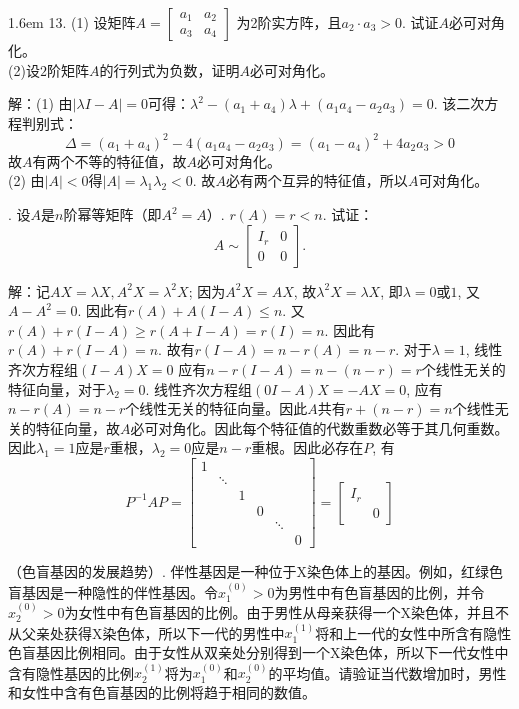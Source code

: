 \documentclass[10pt,twocolumn,letterpaper]{article}
\theoremstyle{mythmstyle}
\begin{document}
\vspace{1em}
\noindent 
{} 
\hangindent 1.6em 
13. (1) 设矩阵$A=\begin{bmatrix} a_{1} & a_{2}\\ a_{3} &a_{4} \end{bmatrix}$ 为2阶实方阵，且$a_{2}\cdot a_{3}>0$. 试证$A$必可对角化。\\
(2)设$2$阶矩阵$A$的行列式为负数，证明$A$必可对角化。 

\noindent 解：(1) 由$|\lambda I-A|=0$可得：$\lambda^{2}-(a_{1}+a_{4})\lambda+(a_{1}a_{4}-a_{2}a_{3})=0$. 该二次方程判别式：$$\Delta=(a_{1}+a_{4})^{2}-4(a_{1}a_{4}-a_{2}a_{3})=(a_{1}-a_{4})^{2}+4a_{2}a_{3}>0$$ 故$A$有两个不等的特征值，故$A$必可对角化。\\
(2) 由$|A|<0$得$|A|=\lambda_{1}\lambda_{2}<0$. 故$A$必有两个互异的特征值，所以$A$可对角化。

\vspace{1em}
. 设$A$是$n$阶幂等矩阵（即$A^{2}=A$）. $r(A)=r<n$. 试证：
$$
A\sim\begin{bmatrix} I_{r} & 0\\ 0 & 0 \end{bmatrix}.
$$

\noindent 解：记$AX=\lambda X, A^{2}X=\lambda^{2}X$; 因为$A^{2}X=AX$, 故$\lambda^{2}X=\lambda X$, 即$\lambda=0$或$1$, 又$A-A^{2}=0$. 因此有$r(A)+A(I-A) \le n$. 又
$r(A)+r(I-A) \ge r(A+I-A)=r(I)=n$. 因此有$r(A)+r(I-A)=n$. 故有$r(I-A)=n-r(A)=n-r$. 对于$\lambda=1$, 线性齐次方程组$(I-A)X=0$ 应有$n-r(I-A)=n-(n-r)=r$个线性无关的特征向量，对于$\lambda_{2}=0$. 线性齐次方程组$(0I-A)X=-AX=0$, 应有$n-r(A)=n-r$个线性无关的特征向量。因此$A$共有$r+(n-r)=n$个线性无关的特征向量，故$A$必可对角化。因此每个特征值的代数重数必等于其几何重数。因此$\lambda_{1}=1$应是$r$重根，$\lambda_{2}=0$应是$n-r$重根。因此必存在$P$, 有
$$P^{-1}AP=
\begin{bmatrix} 
1 & & & & & \\
 & \ddots & & & & \\
 & & 1 & & & \\
 & & & 0 & & \\
 & & & & \ddots & \\
 & & & & & 0
\end{bmatrix}=
\begin{bmatrix}
I_{r} & \\
 & 0
\end{bmatrix}
$$

\vspace{1em}
（色盲基因的发展趋势）. 伴性基因是一种位于X染色体上的基因。例如，红绿色盲基因是一种隐性的伴性基因。令$x_1^{(0)}>0$为男性中有色盲基因的比例，并令$x_2^{(0)}>0$为女性中有色盲基因的比例。由于男性从母亲获得一个X染色体，并且不从父亲处获得X染色体，所以下一代的男性中$x_1^{(1)}$将和上一代的女性中所含有隐性色盲基因比例相同。由于女性从双亲处分别得到一个X染色体，所以下一代女性中含有隐性基因的比例$x_2^{(1)}$将为$x_1^{(0)}$和$x_2^{(0)}$的平均值。请验证当代数增加时，男性和女性中含有色盲基因的比例将趋于相同的数值。
\end{document}
